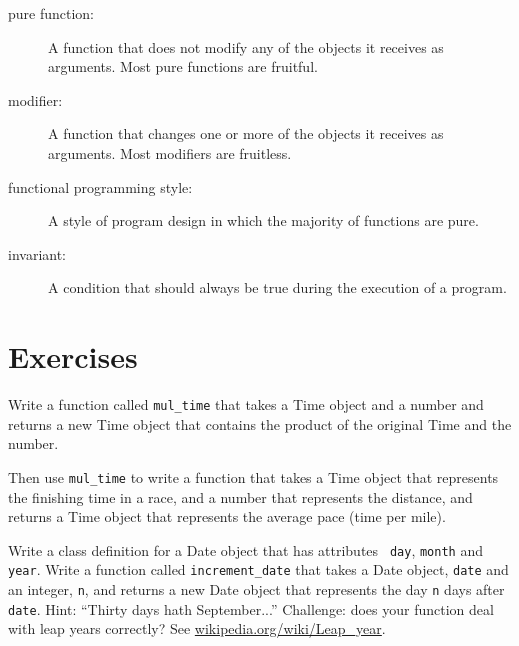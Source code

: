 \documentclass[10pt]{book}
\begin{document}
{\begin{description}
\item[pure function:] A function that does not modify any of the objects it
receives as arguments.  Most pure functions are fruitful.

\item[modifier:] A function that changes one or more of the objects it
receives as arguments.  Most modifiers are fruitless.

\item[functional programming style:] A style of program design in which the
majority of functions are pure.

\item[invariant:] A condition that should always be true during the
execution of a program.

\end{description}


\section{Exercises}

\begin{ex}
Write a function called \verb"mul_time" that takes a Time object
and a number and returns a new Time object that contains
the product of the original Time and the number.

Then use \verb"mul_time" to write a function that takes a Time
object that represents the finishing time in a race, and a number
that represents the distance, and returns a Time object that represents
the average pace (time per mile).


\end{ex}

\begin{ex}


Write a class definition for a Date object that has attributes {\tt
  day}, {\tt month} and {\tt year}.  Write a function called
\verb"increment_date" that takes a Date object, {\tt date} and an
integer, {\tt n}, and returns a new Date object that
represents the day {\tt n} days after {\tt date}.  Hint:
``Thirty days hath September...''  Challenge: does your function
deal with leap years correctly?  See \url{wikipedia.org/wiki/Leap_year}.

\end{ex}


}
\end{document}
